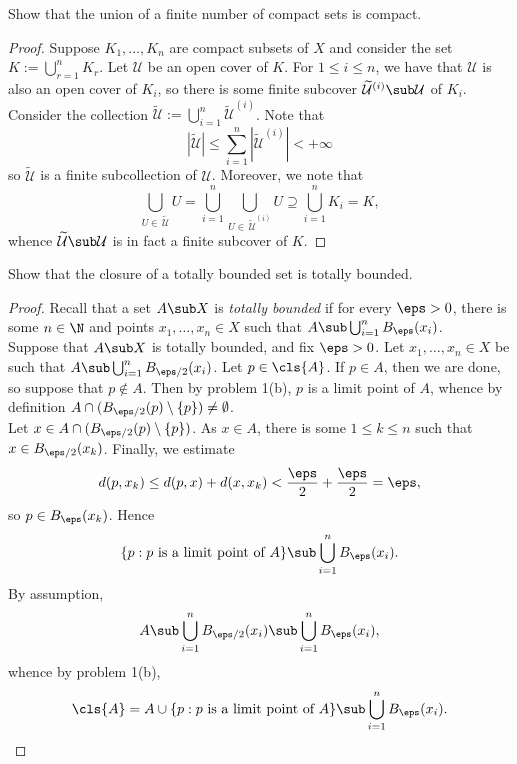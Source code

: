 \documentclass[12pt]{article}
\begin{document}
\begin{homeworkProblem}
  Show that the union of a finite number of compact sets is compact.

\begin{proof}
  Suppose $ K_{1},\ldots, K_{n} $ are compact subsets of $ X $ and consider the set $ K:=\bigcup_{r=1}^{n}K_{r} $. Let $ \mathcal{U} $ be an open cover of $ K $. For $ 1\leq i\leq n $, we have that $ \mathcal{U} $ is also an open cover of $ K_{i} $, so there is some finite subcover $ \widetilde{\mathcal{U}}^{(i)}\sub \mathcal{U} $ of $ K_{i} $.\\

  Consider the collection $ \widetilde{\mathcal{U}} := \bigcup_{i=1}^{n} \widetilde{\mathcal{U}}^{(i)}$. Note that 
  \[
    |\widetilde{\mathcal{U}}| \leq \sum_{i=1}^{n} |\widetilde{\mathcal{U}}^{(i)}| <+\infty
  \]
  so $ \widetilde{\mathcal{U}} $ is a finite subcollection of $ \mathcal{U} $. Moreover, we note that
  \[
    \bigcup_{U\in\, \widetilde{\mathcal{U}}} U = \bigcup_{i=1}^{n}\bigcup_{U\in\, \widetilde{\mathcal{U}}^{(i)}} U \supseteq \bigcup_{i=1}^{n} K_{i} = K,
  \]
  whence $ \widetilde{\mathcal{U}}\sub \mathcal{U} $ is in fact a finite subcover of $ K $.
\end{proof}
  
\end{homeworkProblem}


\begin{homeworkProblem}
  Show that the closure of a totally bounded set is totally bounded.

\begin{proof}
  Recall that a set $ A\sub X $ is \emph{totally bounded} if for every $ \eps>0 $, there is some $ n\in \N $ and points $ x_{1},\ldots, x_{n}\in X $ such that $ A\sub \bigcup_{i=1}^{n}B_{\eps}(x_{i}) $.\\

  Suppose that $ A\sub X $ is totally bounded, and fix $ \eps>0 $. Let $ x_{1},\ldots, x_{n}\in X $ be such that $ A\sub \bigcup_{i=1}^{n}B_{\eps/2}(x_{i}) $. Let $ p\in \cls{A} $. If $ p\in A $, then we are done, so suppose that $ p\not\in A $. Then by problem 1(b), $ p $ is a limit point of $ A $, whence by definition $A\cap (B_{\eps/2}(p)\setminus \{p\}) \neq \emptyset $.\\

  Let $ x\in A\cap (B_{\eps/2}(p)\setminus\{p\}) $. As $ x\in A $, there is some $ 1\leq k\leq n $ such that $ x\in B_{\eps/2}(x_{k}) $. Finally, we estimate
  \begin{align*}
    d(p , x_{k}) \leq d(p,x) + d(x,x_{k}) < \frac{\eps}{2}+ \frac{\eps}{2} = \eps,
  \end{align*}
  so $ p\in B_{\eps}(x_{k}) $. Hence \[ \{p:p \text{ is a limit point of }A\}\sub \bigcup_{i=1}^{n}B_{\eps}(x_{i}).\] By assumption, 
  \[
    A\sub \bigcup_{i=1}^{n} B_{\eps/2}(x_{i}) \sub \bigcup_{i=1}^{n}B_{\eps}(x_{i}),
  \] 
  whence by problem 1(b),
  \[
    \cls{A} = A\cup \{p:p \text{ is a limit point of }A\} \sub \bigcup_{i=1}^{n} B_{\eps}(x_{i}).
  \]



\end{proof}
\end{homeworkProblem}
\end{document}
